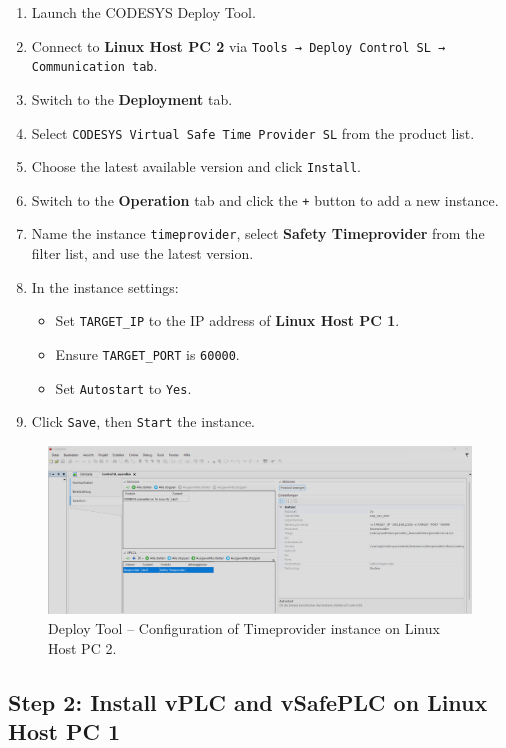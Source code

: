 \documentclass[a4paper,12pt]{article}
\begin{document}
\begin{enumerate}
	\item Launch the CODESYS Deploy Tool.
	\item Connect to \textbf{Linux Host PC 2} via \texttt{Tools → Deploy Control SL → Communication tab}.
	\item Switch to the \textbf{Deployment} tab.
	\item Select \texttt{CODESYS Virtual Safe Time Provider SL} from the product list.
	\item Choose the latest available version and click \texttt{Install}.
	\item Switch to the \textbf{Operation} tab and click the \texttt{+} button to add a new instance.
	\item Name the instance \texttt{timeprovider}, select \textbf{Safety Timeprovider} from the filter list, and use the latest version.
	\item In the instance settings:
	\begin{itemize}
		\item Set \texttt{TARGET\_IP} to the IP address of \textbf{Linux Host PC 1}.
		\item Ensure \texttt{TARGET\_PORT} is \texttt{60000}.
		\item Set \texttt{Autostart} to \texttt{Yes}.
	\end{itemize}
	\item Click \texttt{Save}, then \texttt{Start} the instance.
\end{enumerate}

\begin{figure}[H]
	\centering
	\includegraphics[width=1\textwidth]{5.PNG}
	\caption{Deploy Tool – Configuration of Timeprovider instance on Linux Host PC 2.}
\end{figure}

\subsection*{Step 2: Install vPLC and vSafePLC on Linux Host PC 1}
\end{document}
